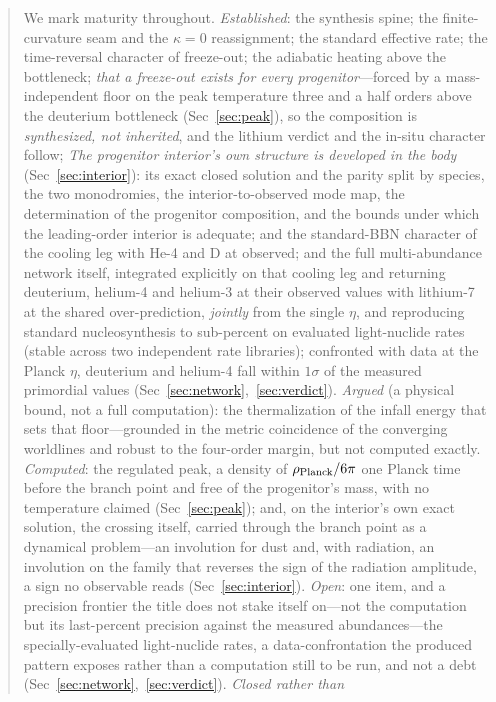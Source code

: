 \documentclass[11pt,a4paper]{article}
\theoremstyle{plain}
\theoremstyle{definition}
\theoremstyle{remark}
\begin{document}
\begin{abstract}
We mark maturity throughout. \emph{Established}: the synthesis spine; the finite-curvature
seam and the $\kappa=0$ reassignment; the standard effective rate; the time-reversal
character of freeze-out; the adiabatic heating above the bottleneck; \emph{that a freeze-out
exists for every progenitor}---forced by a mass-independent floor on the peak temperature three and a half
orders above the deuterium bottleneck (Sec~\ref{sec:peak}), so the composition is
\emph{synthesized, not inherited}, and the lithium verdict and the in-situ character follow; \emph{The progenitor interior's own structure is developed in the body} (Sec~\ref{sec:interior}): its exact closed solution and the parity split by species, the two monodromies, the interior-to-observed mode map, the determination of the progenitor composition, and the bounds under which the leading-order interior is adequate; and the standard-BBN character of the cooling leg with He-4 and D at observed; and the full
multi-abundance network itself, integrated explicitly on that cooling leg and returning deuterium,
helium-4 and helium-3 at their observed values with lithium-7 at the shared over-prediction,
\emph{jointly} from the single $\eta$, and reproducing standard nucleosynthesis to
sub-percent on evaluated light-nuclide rates (stable across two independent rate libraries);
confronted with data at the Planck $\eta$, deuterium and helium-4 fall within $1\sigma$ of the
measured primordial values (Sec~\ref{sec:network},~\ref{sec:verdict}). \emph{Argued}
(a physical bound, not a full computation): the thermalization of the infall energy that sets
that floor---grounded in the metric coincidence of the converging worldlines and robust to the
four-order margin, but not computed exactly. \emph{Computed}: the regulated peak,
a density of $\rho_{\rm Planck}/6\pi$ one Planck time before the branch point and free of the
progenitor's mass, with no temperature claimed (Sec~\ref{sec:peak}); and, on the interior's own exact
solution, the crossing itself, carried through the branch point as a dynamical problem---an involution for dust and,
with radiation, an involution on the family that reverses the sign of the radiation amplitude, a sign
no observable reads (Sec~\ref{sec:interior}). \emph{Open}: one item, and a precision frontier the
title does not stake itself on---not the computation
but its last-percent precision against the measured abundances---the specially-evaluated
light-nuclide rates, a data-confrontation the produced pattern exposes rather
than a computation still to be run, and not a debt
(Sec~\ref{sec:network},~\ref{sec:verdict}). \emph{Closed rather than
}
\end{abstract}
\end{document}
